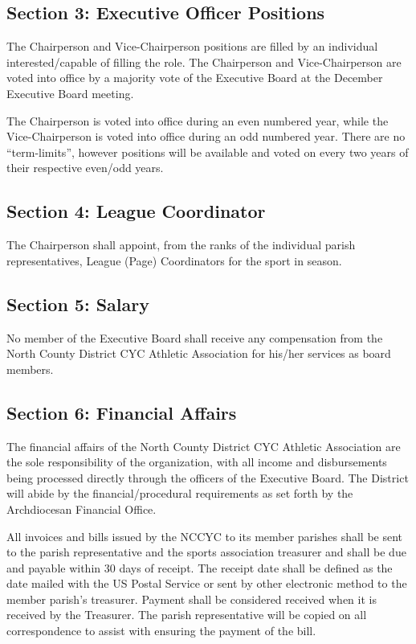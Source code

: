 \documentclass[10pt,oneside,draft]{memoir}
\begin{document}
\subsection{Section 3: Executive Officer Positions}
The Chairperson and Vice-Chairperson positions are filled by an individual interested/capable of filling the role. The Chairperson and Vice-Chairperson are voted into office by a majority vote of the Executive Board at the December Executive Board meeting.

The Chairperson is voted into office during an even numbered year, while the Vice-Chairperson is voted into office during an odd numbered year. There are no “term-limits”, however positions will be available and voted on every two years of their respective even/odd years.

\subsection{Section 4: League Coordinator}
The Chairperson shall appoint, from the ranks of the individual parish representatives, League (Page) Coordinators for the sport in season.

\subsection{Section 5: Salary}
No member of the Executive Board shall receive any compensation from the North County District CYC Athletic Association for his/her services as board members.

\subsection{Section 6: Financial Affairs}
The financial affairs of the North County District CYC Athletic Association are the sole responsibility of the organization, with all income and disbursements being processed directly through the officers of the Executive Board.  The District will abide by the financial/procedural requirements as set forth by the Archdiocesan Financial Office.

All invoices and bills issued by the NCCYC to its member parishes shall be sent to the parish representative and the sports association treasurer and shall be due and payable within 30 days of receipt.  The receipt date shall be defined as the date mailed with the US Postal Service or sent by other electronic method to the member parish’s treasurer.  Payment shall be considered received when it is received by the Treasurer.  The parish representative will be copied on all correspondence to assist with ensuring the payment of the bill.
\end{document}
